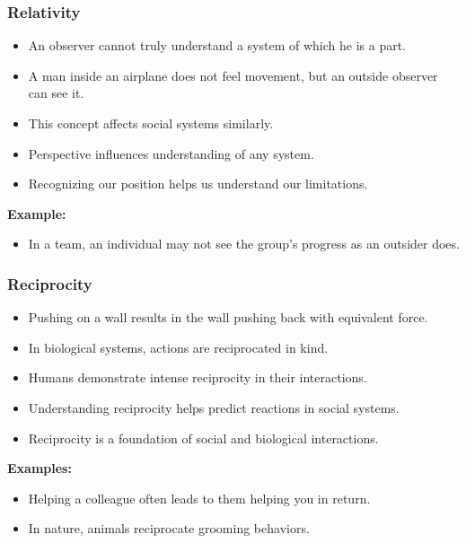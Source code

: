 \begin{frame}[fragile]\frametitle{Relativity}
\begin{itemize}
    \item An observer cannot truly understand a system of which he is a part.
    \item A man inside an airplane does not feel movement, but an outside observer can see it.
    \item This concept affects social systems similarly.
    \item Perspective influences understanding of any system.
    \item Recognizing our position helps us understand our limitations.
\end{itemize}
\textbf{Example:}
\begin{itemize}
    \item In a team, an individual may not see the group's progress as an outsider does.
\end{itemize}
\end{frame}

\begin{frame}[fragile]\frametitle{Reciprocity}
\begin{itemize}
    \item Pushing on a wall results in the wall pushing back with equivalent force.
    \item In biological systems, actions are reciprocated in kind.
    \item Humans demonstrate intense reciprocity in their interactions.
    \item Understanding reciprocity helps predict reactions in social systems.
    \item Reciprocity is a foundation of social and biological interactions.
\end{itemize}
\textbf{Examples:}
\begin{itemize}
    \item Helping a colleague often leads to them helping you in return.
    \item In nature, animals reciprocate grooming behaviors.
\end{itemize}
\end{frame}

